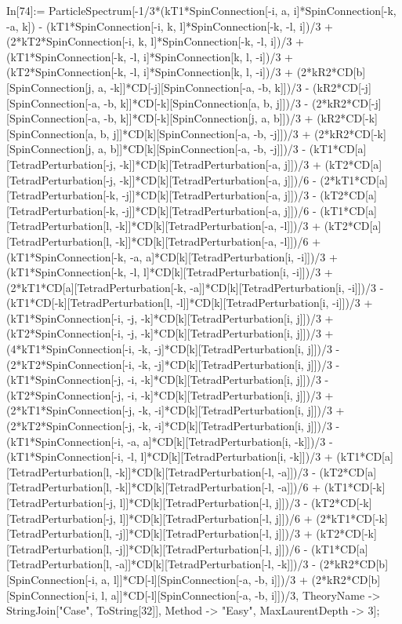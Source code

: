 In[74]:= ParticleSpectrum[-1/3*(kT1*SpinConnection[-i, a, i]*SpinConnection[-k, -a, k]) - (kT1*SpinConnection[-i, k, l]*SpinConnection[-k, -l, i])/3 + (2*kT2*SpinConnection[-i, k, l]*SpinConnection[-k, -l, i])/3 + (kT1*SpinConnection[-k, -l, i]*SpinConnection[k, l, -i])/3 + (kT2*SpinConnection[-k, -l, i]*SpinConnection[k, l, -i])/3 + (2*kR2*CD[b][SpinConnection[j, a, -k]]*CD[-j][SpinConnection[-a, -b, k]])/3 - (kR2*CD[-j][SpinConnection[-a, -b, k]]*CD[-k][SpinConnection[a, b, j]])/3 - (2*kR2*CD[-j][SpinConnection[-a, -b, k]]*CD[-k][SpinConnection[j, a, b]])/3 + (kR2*CD[-k][SpinConnection[a, b, j]]*CD[k][SpinConnection[-a, -b, -j]])/3 + (2*kR2*CD[-k][SpinConnection[j, a, b]]*CD[k][SpinConnection[-a, -b, -j]])/3 - (kT1*CD[a][TetradPerturbation[-j, -k]]*CD[k][TetradPerturbation[-a, j]])/3 + (kT2*CD[a][TetradPerturbation[-j, -k]]*CD[k][TetradPerturbation[-a, j]])/6 - (2*kT1*CD[a][TetradPerturbation[-k, -j]]*CD[k][TetradPerturbation[-a, j]])/3 - (kT2*CD[a][TetradPerturbation[-k, -j]]*CD[k][TetradPerturbation[-a, j]])/6 - (kT1*CD[a][TetradPerturbation[l, -k]]*CD[k][TetradPerturbation[-a, -l]])/3 + (kT2*CD[a][TetradPerturbation[l, -k]]*CD[k][TetradPerturbation[-a, -l]])/6 + (kT1*SpinConnection[-k, -a, a]*CD[k][TetradPerturbation[i, -i]])/3 + (kT1*SpinConnection[-k, -l, l]*CD[k][TetradPerturbation[i, -i]])/3 + (2*kT1*CD[a][TetradPerturbation[-k, -a]]*CD[k][TetradPerturbation[i, -i]])/3 - (kT1*CD[-k][TetradPerturbation[l, -l]]*CD[k][TetradPerturbation[i, -i]])/3 + (kT1*SpinConnection[-i, -j, -k]*CD[k][TetradPerturbation[i, j]])/3 + (kT2*SpinConnection[-i, -j, -k]*CD[k][TetradPerturbation[i, j]])/3 + (4*kT1*SpinConnection[-i, -k, -j]*CD[k][TetradPerturbation[i, j]])/3 - (2*kT2*SpinConnection[-i, -k, -j]*CD[k][TetradPerturbation[i, j]])/3 - (kT1*SpinConnection[-j, -i, -k]*CD[k][TetradPerturbation[i, j]])/3 - (kT2*SpinConnection[-j, -i, -k]*CD[k][TetradPerturbation[i, j]])/3 + (2*kT1*SpinConnection[-j, -k, -i]*CD[k][TetradPerturbation[i, j]])/3 + (2*kT2*SpinConnection[-j, -k, -i]*CD[k][TetradPerturbation[i, j]])/3 - (kT1*SpinConnection[-i, -a, a]*CD[k][TetradPerturbation[i, -k]])/3 - (kT1*SpinConnection[-i, -l, l]*CD[k][TetradPerturbation[i, -k]])/3 + (kT1*CD[a][TetradPerturbation[l, -k]]*CD[k][TetradPerturbation[-l, -a]])/3 - (kT2*CD[a][TetradPerturbation[l, -k]]*CD[k][TetradPerturbation[-l, -a]])/6 + (kT1*CD[-k][TetradPerturbation[-j, l]]*CD[k][TetradPerturbation[-l, j]])/3 - (kT2*CD[-k][TetradPerturbation[-j, l]]*CD[k][TetradPerturbation[-l, j]])/6 + (2*kT1*CD[-k][TetradPerturbation[l, -j]]*CD[k][TetradPerturbation[-l, j]])/3 + (kT2*CD[-k][TetradPerturbation[l, -j]]*CD[k][TetradPerturbation[-l, j]])/6 - (kT1*CD[a][TetradPerturbation[l, -a]]*CD[k][TetradPerturbation[-l, -k]])/3 - (2*kR2*CD[b][SpinConnection[-i, a, l]]*CD[-l][SpinConnection[-a, -b, i]])/3 + (2*kR2*CD[b][SpinConnection[-i, l, a]]*CD[-l][SpinConnection[-a, -b, i]])/3, TheoryName -> StringJoin["Case", ToString[32]], Method -> "Easy", MaxLaurentDepth -> 3]; 